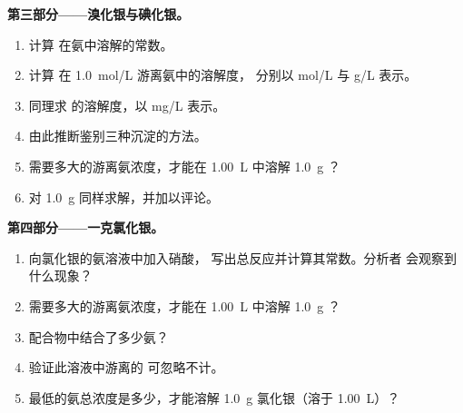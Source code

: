 \begin{problem}
\medskip
\noindent\textbf{第三部分——溴化银与碘化银。}
\begin{enumerate}[resume]
  \item 计算  在氨中溶解的常数。
  \item 计算  在 \qty{1.0}{mol/L} 游离氨中的溶解度，
        分别以 \unit{mol/L} 与 \unit{g/L} 表示。
  \item 同理求  的溶解度，以 \unit{mg/L} 表示。
  \item 由此推断鉴别三种沉淀的方法。
  \item 需要多大的游离氨浓度，才能在
        \qty{1.00}{L} 中溶解 \qty{1.0}{g} ？
  \item 对 \qty{1.0}{g}  同样求解，并加以评论。
\end{enumerate}

\medskip
\noindent\textbf{第四部分——一克氯化银。}
\begin{enumerate}[resume]
  \item 向氯化银的氨溶液中加入硝酸，
        写出总反应并计算其常数。分析者
        会观察到什么现象？
  \item 需要多大的游离氨浓度，才能在
        \qty{1.00}{L} 中溶解 \qty{1.0}{g} ？
  \item 配合物中结合了多少氨？
  \item 验证此溶液中游离的  可忽略不计。
  \item 最低的氨总浓度是多少，才能溶解
        \qty{1.0}{g} 氯化银（溶于 \qty{1.00}{L}）？
\end{enumerate}
\end{problem}
